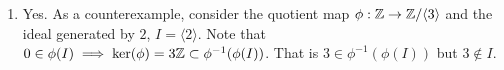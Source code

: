 \documentclass[Notebook.tex]{subfiles}
\begin{document}
\begin{solution}
\begin{enumerate}[label=(\alph*),ref=\theenumi\alph*]
        
        $\phi^{-1}(\phi(I)) \subseteq I$

        Let $x \in \phi^{-1}(\phi(I))$. That is $\phi(x) = \phi(a)$ for some $a \in I$. 

        \[\phi(x-a) = 0 \implies x-a \in \ker(\phi) \subset I\]
        
        Since $I$ is closed under addition $x \in I$. Hence, 
        $\phi^{-1}(\phi(I)) \subseteq I$

        \item Yes. As a counterexample, consider the quotient map $\phi: \mathbb Z \to \mathbb Z/\langle 3 \rangle$ and the ideal generated by $ 2$, $I = \langle {2} \rangle$. Note that $ 0 \in \phi(I) \implies \ker(\phi) = 3\mathbb Z \subset \phi^{-1}(\phi(I))$. 
        That is $3 \in \phi^{-1}(\phi(I))$ but $3 \notin I$. 
    \end{enumerate}
\end{solution}
\end{document}
